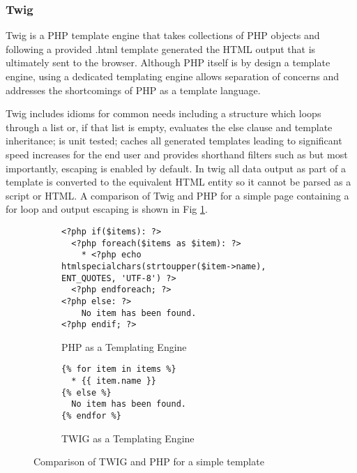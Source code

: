 \subsubsection{Twig}
Twig is a PHP template engine that takes collections of PHP objects and following a provided .html template generated the HTML output that is ultimately sent to the browser. Although PHP itself is by design a template engine, using a dedicated templating engine allows separation of concerns and addresses the shortcomings of PHP as a template language.

Twig includes idioms for common needs including a  structure which loops through a list or, if that list is empty, evaluates the else clause and template inheritance; is unit tested; caches all generated templates leading to significant speed increases for the end user and provides shorthand filters such as  but most importantly, escaping is enabled by default. In twig all data output as part of a template is converted to the equivalent HTML entity so it cannot be parsed as a script or HTML.
% 
A comparison of Twig and PHP for a simple page containing a for loop and output escaping is shown in Fig \ref{fig:comparephptwig}.

\begin{figure}
\centering

\begin{subfigure}[a]{\textwidth}
\centering
\begin{lstlisting}[style=phpcolor]
<?php if($items): ?>
  <?php foreach($items as $item): ?>
    * <?php echo htmlspecialchars(strtoupper($item->name), ENT_QUOTES, 'UTF-8') ?>
  <?php endforeach; ?>
<?php else: ?>
    No item has been found.
<?php endif; ?>
\end{lstlisting}
\caption{PHP as a Templating Engine}
\end{subfigure}

\begin{subfigure}[b]{\textwidth}
\centering
\begin{lstlisting}[style=phpcolor,language=twig]
{% for item in items %}
  * {{ item.name }}
{% else %}
  No item has been found.
{% endfor %}
\end{lstlisting}
\caption{TWIG as a Templating Engine}
\end{subfigure}

\caption{Comparison of TWIG and PHP for a simple template}
\label{fig:comparephptwig}
\end{figure}

